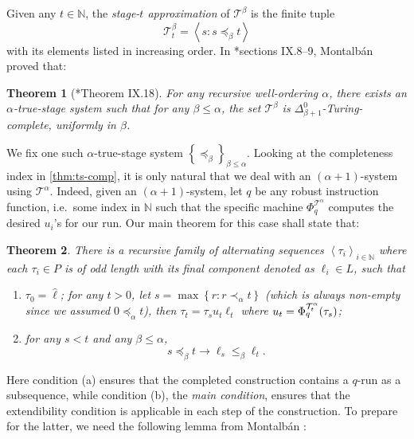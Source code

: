 \documentclass[11pt]{article}
\theoremstyle{plain}
\newtheorem{theorem}{Theorem}[section]
\theoremstyle{definition}
\newcommand{\tuple}[1]{\left\langle #1 \right\rangle}
\begin{document}
Given any $t \in \mathbb{N}$, the \emph{stage-$t$ approximation} of $\mathcal{T}^\beta$ is the finite tuple
\[\mathcal{T}^\beta_t = \tuple{s : s \preceq_\beta t}\]
with its elements listed in increasing order. In \cite{montalban26-computable-structure}*{sections IX.8--9}, Montalb\'an proved that:

\begin{theorem}[\cite{montalban26-computable-structure}*{Theorem IX.18}]
  \label{thm:ts-comp}
  For any recursive well-ordering $\alpha$, there exists an $\alpha$-true-stage system such that for any $\beta \leq \alpha$, the set $\mathcal{T}^\beta$ is $\Delta^0_{\beta + 1}$-Turing-complete, uniformly in $\beta$.
\end{theorem}

We fix one such $\alpha$-true-stage system $\left\{\preceq_\beta\right\}_{\beta \leq \alpha}$. Looking at the completeness index in \autoref{thm:ts-comp}, it is only natural that we deal with an $\left(\alpha + 1\right)$-system using $\mathcal{T}^\alpha$. Indeed, given an $\left(\alpha + 1\right)$-system, let $q$ be any robust instruction function, i.e.\ some index in $\mathbb{N}$ such that the specific machine $\Phi_q^{\mathcal{T}^\alpha}$ computes the desired $u_i$'s for our run. Our main theorem for this case shall state that:

\begin{theorem}
  \label{thm:robust-succ-main}
  There is a recursive family of alternating sequences $\tuple{\tau_i}_{i \in \mathbb{N}}$ where each $\tau_i \in P$ is of odd length with its final component denoted as $\ell_i \in L$, such that
  \begin{enumerate}[label=\textnormal{(\alph*)}]
    \item $\tau_0 = \hat{\ell}$; for any $t > 0$, let $s = \max \left\{r : r \prec_\alpha t\right\}$ (which is always non-empty since we assumed $0 \preceq_\alpha t$), then $\tau_t = \tau_s u_t \ell_t$ where $u_t = \Phi_q^{\mathcal{T}^\alpha_t}\mleft(\tau_s\mright)$;
    \item for any $s < t$ and any $\beta \leq \alpha$,
          \[\label{eqn:robust-succ-mc}
            s \preceq_\beta t \longrightarrow \ell_s \leq_\beta \ell_t.
            \tag{MC}\]
  \end{enumerate}
\end{theorem}

Here condition (a) ensures that the completed construction contains a $q$-run as a subsequence, while condition (b), the \emph{main condition}, ensures that the extendibility condition is applicable in each step of the construction. To prepare for the latter, we need the following lemma from Montalb\'an \cite{montalban26-computable-structure}:
\end{document}
